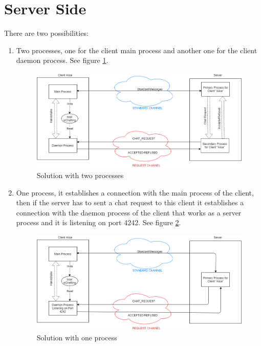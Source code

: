 \documentclass[11pt]{report}
\begin{document}
\section{Server Side}
\noindent There are two possibilities:
\begin{enumerate}
	\item Two processes, one for the client main process and another one for the client daemon process. See figure \ref{img: chatRequestProtocolTwoProcesses}.
	
	\begin{figure}[htpb]
		\centering
		\includegraphics[scale=0.5]{img/chatRequestProtocolTwoProcesses.png}
		\caption{Solution with two processes}
		\label {img: chatRequestProtocolTwoProcesses}
	\end{figure}
	
	
	\item One process, it establishes a connection with the main process of the client, then if the server has to sent a chat request to this client it establishes a connection with the daemon process of the client that works as a server process and it is listening on port 4242. See figure \ref{img: chatRequestProtocolOneProcess}.
	
	\begin{figure}[htpb]
		\centering
		\includegraphics[scale=0.5]{img/chatRequestProtocolOneProcess.png}
		\caption{Solution with one process}
		\label {img: chatRequestProtocolOneProcess}
	\end{figure}
	

\end{enumerate}
\end{document}
